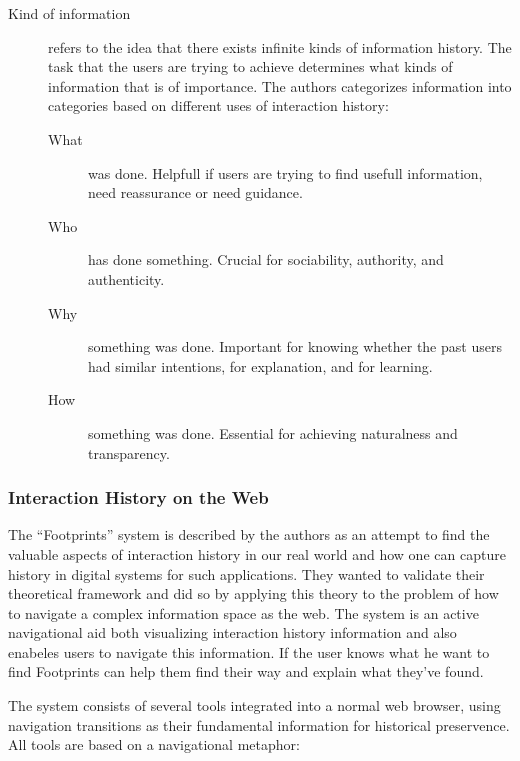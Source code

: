 \documentclass[12pt,a4paper]{article}
\begin{document}
\begin{description}
  \item[Kind of information] refers to the idea that there exists infinite
    kinds of information history. The task that the users are trying to
    achieve determines what kinds of information that is of importance. The
    authors categorizes information into categories based on different uses of
    interaction history:
  \begin{description}
    \item[What] was done. Helpfull if users are trying to find usefull
      information, need reassurance or need guidance.
    \item[Who] has done something. Crucial for sociability, authority, and
      authenticity. 
    \item[Why] something was done. Important for knowing whether the past users
      had similar intentions, for explanation, and for learning.
    \item[How] something was done. Essential for achieving naturalness and
      transparency.
  \end{description}
\end{description}

\subsubsection{Interaction History on the Web}

The ``Footprints'' system is described by the authors as an attempt to find
the valuable aspects of interaction history in our real world and how one can
capture history in digital systems for such applications. They wanted to
validate their theoretical framework and did so by applying this theory to the
problem of how to navigate a complex information space as the web. The system
is an active navigational aid both visualizing interaction history
information and also enabeles users to navigate this information. If the user
knows what he want to find Footprints can help them find their way and
explain what they've found.

The system consists of several tools integrated into a normal web browser,
using navigation transitions as their fundamental information for historical
preservence. All tools are based on a navigational metaphor:
\end{document}
